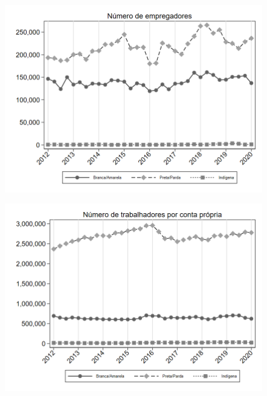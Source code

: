 \begin{frame}[label=_composicao_demografica_raca_n_empregador]{}
\textit{\hyperlink{_composicao_demografica_raca}{}}
\begin{figure}
  \centering
  \includegraphics[width=1.0\linewidth]{../../analysis/output/composicao_demografica/raca/_composicao_demografica_raca_n_empregador.png}
  \caption{}
  \label{fig:_composicao_demografica_raca_n_empregador}
\end{figure}
\end{frame}



\begin{frame}[label=_composicao_demografica_raca_n_cpropria]{}
\textit{\hyperlink{_composicao_demografica_raca}{}}
\begin{figure}
  \centering
  \includegraphics[width=1.0\linewidth]{../../analysis/output/composicao_demografica/raca/_composicao_demografica_raca_n_cpropria.png}
  \caption{}
  \label{fig:_composicao_demografica_raca_n_cpropria}
\end{figure}
\end{frame}

